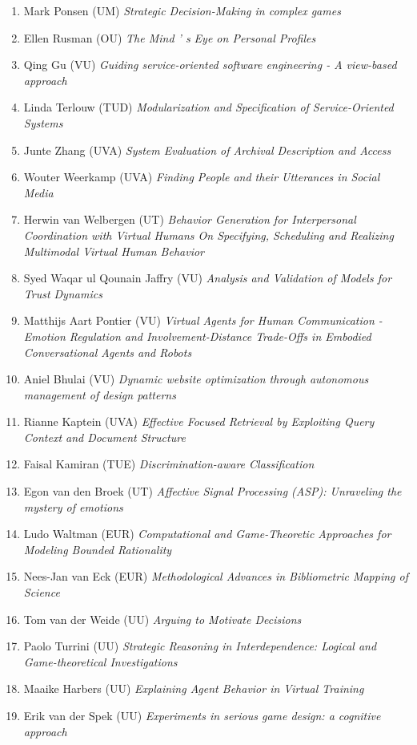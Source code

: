 \begin{multicols}{2}
\begin{scriptsize}
\begin{enumerate}[leftmargin=*,noitemsep,topsep=0pt,parsep=1pt,partopsep=0pt]
{}\item Mark Ponsen (UM) \textit{Strategic Decision-Making in complex games 
}\item Ellen Rusman (OU) \textit{The Mind ' s Eye on Personal Profiles
}\item Qing Gu (VU) \textit{Guiding service-oriented software engineering - A view-based approach 
}\item Linda Terlouw (TUD) \textit{Modularization and Specification of Service-Oriented Systems 
}\item Junte Zhang (UVA) \textit{System Evaluation of Archival Description and Access 
}\item Wouter Weerkamp (UVA) \textit{Finding People and their Utterances in Social Media 
}\item Herwin van Welbergen (UT) \textit{Behavior Generation for Interpersonal Coordination with Virtual Humans On Specifying, Scheduling and Realizing Multimodal Virtual Human Behavior 
}\item Syed Waqar ul Qounain Jaffry (VU) \textit{Analysis and Validation of Models for Trust Dynamics
}\item Matthijs Aart Pontier (VU) \textit{Virtual Agents for Human Communication - Emotion Regulation and Involvement-Distance Trade-Offs in Embodied Conversational Agents and Robots 
}\item Aniel Bhulai (VU) \textit{Dynamic website optimization through autonomous management of design patterns
}\item Rianne Kaptein (UVA) \textit{Effective Focused Retrieval by Exploiting Query Context and Document Structure 
}\item Faisal Kamiran (TUE) \textit{Discrimination-aware Classification
}\item Egon van den Broek (UT) \textit{Affective Signal Processing (ASP): Unraveling the mystery of emotions 
}\item Ludo Waltman (EUR) \textit{Computational and Game-Theoretic Approaches for Modeling Bounded Rationality
}\item Nees-Jan van Eck (EUR) \textit{Methodological Advances in Bibliometric Mapping of Science
}\item Tom van der Weide (UU) \textit{Arguing to Motivate Decisions
}\item Paolo Turrini (UU) \textit{Strategic Reasoning in Interdependence: Logical and Game-theoretical Investigations 
}\item Maaike Harbers (UU) \textit{Explaining Agent Behavior in Virtual Training 
}\item Erik van der Spek (UU) \textit{Experiments in serious game design: a cognitive approach 
}
\end{enumerate}
\end{scriptsize}
\end{multicols}
